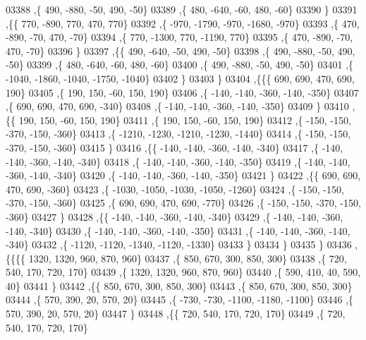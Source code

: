 \begin{DoxyCode}
03388     ,\{   490,  -880,   -50,   490,   -50\}
03389     ,\{   480,  -640,   -60,   480,   -60\}
03390     \}
03391    ,\{\{   770,  -890,   770,   470,   770\}
03392     ,\{  -970, -1790,  -970, -1680,  -970\}
03393     ,\{   470,  -890,   -70,   470,   -70\}
03394     ,\{   770, -1300,   770, -1190,   770\}
03395     ,\{   470,  -890,   -70,   470,   -70\}
03396     \}
03397    ,\{\{   490,  -640,   -50,   490,   -50\}
03398     ,\{   490,  -880,   -50,   490,   -50\}
03399     ,\{   480,  -640,   -60,   480,   -60\}
03400     ,\{   490,  -880,   -50,   490,   -50\}
03401     ,\{ -1040, -1860, -1040, -1750, -1040\}
03402     \}
03403    \}
03404   ,\{\{\{   690,   690,   470,   690,   190\}
03405     ,\{   190,   150,   -60,   150,   190\}
03406     ,\{  -140,  -140,  -360,  -140,  -350\}
03407     ,\{   690,   690,   470,   690,  -340\}
03408     ,\{  -140,  -140,  -360,  -140,  -350\}
03409     \}
03410    ,\{\{   190,   150,   -60,   150,   190\}
03411     ,\{   190,   150,   -60,   150,   190\}
03412     ,\{  -150,  -150,  -370,  -150,  -360\}
03413     ,\{ -1210, -1230, -1210, -1230, -1440\}
03414     ,\{  -150,  -150,  -370,  -150,  -360\}
03415     \}
03416    ,\{\{  -140,  -140,  -360,  -140,  -340\}
03417     ,\{  -140,  -140,  -360,  -140,  -340\}
03418     ,\{  -140,  -140,  -360,  -140,  -350\}
03419     ,\{  -140,  -140,  -360,  -140,  -340\}
03420     ,\{  -140,  -140,  -360,  -140,  -350\}
03421     \}
03422    ,\{\{   690,   690,   470,   690,  -360\}
03423     ,\{ -1030, -1050, -1030, -1050, -1260\}
03424     ,\{  -150,  -150,  -370,  -150,  -360\}
03425     ,\{   690,   690,   470,   690,  -770\}
03426     ,\{  -150,  -150,  -370,  -150,  -360\}
03427     \}
03428    ,\{\{  -140,  -140,  -360,  -140,  -340\}
03429     ,\{  -140,  -140,  -360,  -140,  -340\}
03430     ,\{  -140,  -140,  -360,  -140,  -350\}
03431     ,\{  -140,  -140,  -360,  -140,  -340\}
03432     ,\{ -1120, -1120, -1340, -1120, -1330\}
03433     \}
03434    \}
03435   \}
03436  ,\{\{\{\{  1320,  1320,   960,   870,   960\}
03437     ,\{   850,   670,   300,   850,   300\}
03438     ,\{   720,   540,   170,   720,   170\}
03439     ,\{  1320,  1320,   960,   870,   960\}
03440     ,\{   590,   410,    40,   590,    40\}
03441     \}
03442    ,\{\{   850,   670,   300,   850,   300\}
03443     ,\{   850,   670,   300,   850,   300\}
03444     ,\{   570,   390,    20,   570,    20\}
03445     ,\{  -730,  -730, -1100, -1180, -1100\}
03446     ,\{   570,   390,    20,   570,    20\}
03447     \}
03448    ,\{\{   720,   540,   170,   720,   170\}
03449     ,\{   720,   540,   170,   720,   170\}

\end{DoxyCode}
